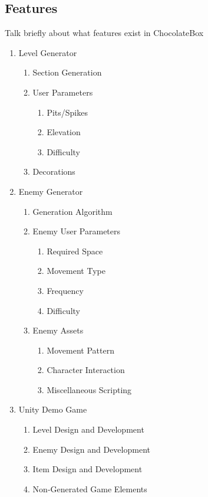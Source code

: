 \documentclass[pdftex,12pt,letter]{article}
\begin{document}
\subsection{Features}
Talk briefly about what features exist in ChocolateBox
\begin{enumerate}
\item Level Generator
\begin{enumerate}
\item Section Generation
\item User Parameters
\begin{enumerate}
\item Pits/Spikes
\item Elevation
\item Difficulty
\end{enumerate}
\item Decorations
\end{enumerate}

\item Enemy Generator
\begin{enumerate}
\item Generation Algorithm
\item Enemy User Parameters
\begin{enumerate}
\item Required Space
\item Movement Type
\item Frequency
\item Difficulty
\end{enumerate}
\item Enemy Assets
\begin{enumerate}
\item Movement Pattern
\item Character Interaction
\item Miscellaneous Scripting
\end{enumerate}
\end{enumerate}

\item{Unity Demo Game}
\begin{enumerate}
\item Level Design and Development
\item Enemy Design and Development
\item Item Design and Development
\item Non-Generated Game Elements
\end{enumerate}
\end{enumerate}
\end{document}

